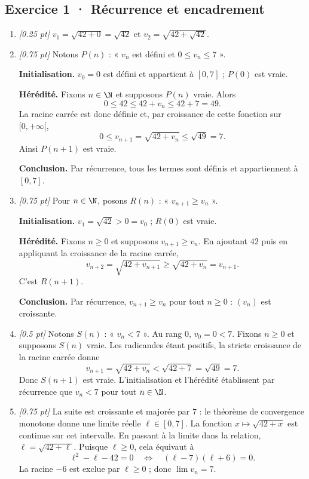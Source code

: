 \subsection*{Exercice 1 · Récurrence et encadrement}\begin{enumerate}

\item \textit{[\num{0,25} pt]} $v_1=\sqrt{42+0}=\sqrt{42}$ et $v_2=\sqrt{42+\sqrt{42}}$.

\item \textit{[\num{0,75} pt]} Notons $P(n)$ : « $v_n$ est défini et $0\le v_n\le 7$ ».
\par\smallskip\textbf{Initialisation.} $v_0=0$ est défini et appartient à $[0,7]$ ; $P(0)$ est vraie.
\par\smallskip\textbf{Hérédité.} Fixons $n\in\N$ et supposons $P(n)$ vraie. Alors
\[0\le 42\le 42+v_n\le 42+7=49.\]
La racine carrée est donc définie et, par croissance de cette fonction sur $[0,+\infty[$,
\[0\le v_{n+1}=\sqrt{42+v_n}\le\sqrt{49}=7.\]
Ainsi $P(n+1)$ est vraie.
\par\smallskip\textbf{Conclusion.} Par récurrence, tous les termes sont définis et appartiennent à $[0,7]$.

\item \textit{[\num{0,75} pt]} Pour $n\in\N$, posons $R(n)$ : « $v_{n+1}\ge v_n$ ».
\par\smallskip\textbf{Initialisation.} $v_1=\sqrt{42}>0=v_0$ ; $R(0)$ est vraie.
\par\smallskip\textbf{Hérédité.} Fixons $n\ge0$ et supposons $v_{n+1}\ge v_n$. En ajoutant $42$ puis en appliquant la croissance de la racine carrée,
\[v_{n+2}=\sqrt{42+v_{n+1}}\ge\sqrt{42+v_n}=v_{n+1}.\]
C'est $R(n+1)$.
\par\smallskip\textbf{Conclusion.} Par récurrence, $v_{n+1}\ge v_n$ pour tout $n\ge0$ : $(v_n)$ est croissante.

\item \textit{[\num{0,5} pt]} Notons $S(n)$ : « $v_n<7$ ». Au rang $0$, $v_0=0<7$.
Fixons $n\ge0$ et supposons $S(n)$ vraie. Les radicandes étant positifs, la stricte croissance de la racine carrée donne
\[v_{n+1}=\sqrt{42+v_n}<\sqrt{42+7}=\sqrt{49}=7.\]
Donc $S(n+1)$ est vraie. L'initialisation et l'hérédité établissent par récurrence que $v_n<7$ pour tout $n\in\N$.

\item \textit{[\num{0,75} pt]} La suite est croissante et majorée par $7$ : le théorème de convergence monotone donne une limite réelle $\ell\in[0,7]$.
La fonction $x\mapsto\sqrt{42+x}$ est continue sur cet intervalle. En passant à la limite dans la relation, $\ell=\sqrt{42+\ell}$. Puisque $\ell\ge0$, cela équivaut à
\[\ell^2-\ell-42=0\quad\Longleftrightarrow\quad(\ell-7)(\ell+6)=0.\]
La racine $-6$ est exclue par $\ell\ge0$ ; donc $\lim v_n=7$.


\end{enumerate}
